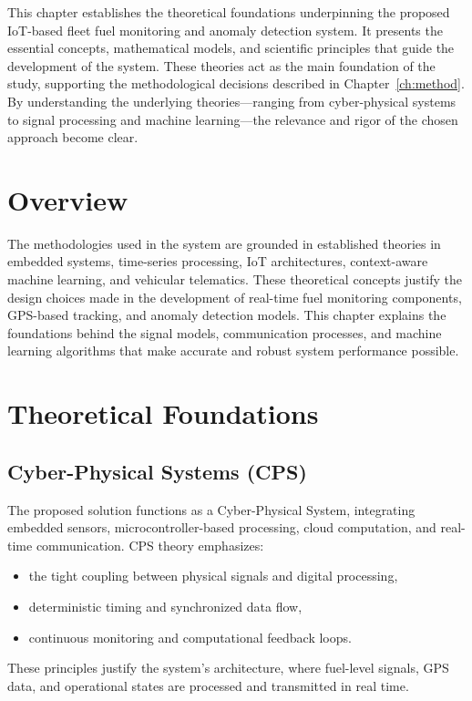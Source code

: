 This chapter establishes the theoretical foundations underpinning the proposed IoT-based fleet fuel monitoring and anomaly detection system. It presents the essential concepts, mathematical models, and scientific principles that guide the development of the system. These theories act as the main foundation of the study, supporting the methodological decisions described in Chapter~\ref{ch:method}. By understanding the underlying theories—ranging from cyber-physical systems to signal processing and machine learning—the relevance and rigor of the chosen approach become clear.

\section{Overview}

The methodologies used in the system are grounded in established theories in embedded systems, time-series processing, IoT architectures, context-aware machine learning, and vehicular telematics. These theoretical concepts justify the design choices made in the development of real-time fuel monitoring components, GPS-based tracking, and anomaly detection models. This chapter explains the foundations behind the signal models, communication processes, and machine learning algorithms that make accurate and robust system performance possible.

\section{Theoretical Foundations}

\subsection{Cyber-Physical Systems (CPS)}

The proposed solution functions as a Cyber-Physical System, integrating embedded sensors, microcontroller-based processing, cloud computation, and real-time communication. CPS theory emphasizes:
\begin{itemize}
    \item the tight coupling between physical signals and digital processing,
    \item deterministic timing and synchronized data flow,
    \item continuous monitoring and computational feedback loops.
\end{itemize}
These principles justify the system’s architecture, where fuel-level signals, GPS data, and operational states are processed and transmitted in real time.


